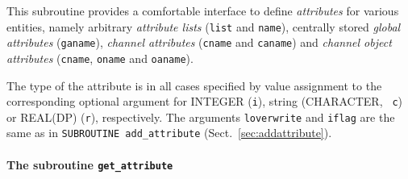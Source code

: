 \documentclass[twoside]{article}
\begin{document}
This subroutine provides a comfortable interface to define {\it attributes}
for various entities, namely
arbitrary {\it attribute lists} ({\tt list} and {\tt name}),
centrally stored {\it global attributes} ({\tt ganame}),
{\it channel attributes} ({\tt cname} and {\tt caname}) and
{\it channel object attributes} ({\tt cname}, {\tt oname} and {\tt oaname}).

The type of the attribute is in all cases specified by value assignment to the
corresponding optional argument for INTEGER ({\tt i}), string (CHARACTER, {\tt
c}) or REAL(DP) ({\tt r}), respectively.
The arguments {\tt loverwrite} and
{\tt iflag} are the same as in
{\tt SUBROUTINE add\_attribute} (Sect.~\ref{sec:addattribute}).

\paragraph{The subroutine {\tt get\_attribute}}\mbox{}\\
\end{document}
